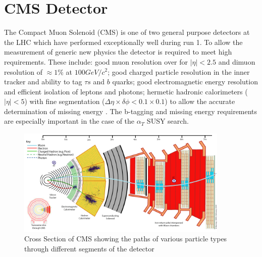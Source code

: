 
\chapter{CMS Detector} %

\label{Chapter 2} %


The Compact Muon Solenoid (CMS\cite{CMSTDR}) is one of two general purpose detectors at the LHC which have performed exceptionally well during run 1. To allow the measurement of generic new physics the detector is required to meet high requirements. These include: good muon resolution over for $|\eta|<2.5$ and dimuon resolution of     $\approx 1\%$ at $100GeV/c^2$; good charged particle resolution in the inner tracker and ability to tag $\tau s$ and $b$ quarks; good electromagnetic energy resolution and efficient isolation of leptons and photons; hermetic hadronic calorimeters ($|\eta|<5$) with fine segmentation ($\Delta\eta\times\delta\phi<0.1\times0.1$) to allow the accurate determination of missing energy \cite{physreq}. The b-tagging and missing energy requirements are especially important in the case of the $\alpha_T$ SUSY search.

\begin{figure}
\centering
    \includegraphics[width=0.9\textwidth]{./Figures/CMS_Slice.jpg}
  \caption{Cross Section of CMS showing the paths of various particle types through different segments of the detector \cite{cmsslice}}
  \label{CMS_SLICE}
\end{figure}

